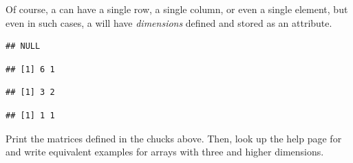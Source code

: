 \documentclass[krantz2]{krantz}\usepackage{knitr}%
\begin{document}
\begin{explainbox}
Of course, a  can have a single row, a single column, or even a single element, but even in such cases, a  will have \emph{dimensions} defined and stored as an attribute.

\begin{knitrout}\footnotesize
{}\color{fgcolor}\begin{kframe}
\begin{alltt}
 \hlkwb{<-} \hlopt{:}
\end{alltt}
\begin{verbatim}
## NULL
\end{verbatim}
\end{kframe}
\end{knitrout}

\begin{knitrout}\footnotesize
{}\color{fgcolor}\begin{kframe}
\begin{alltt}
 \hlkwb{<-} \hlstd{(}\hlopt{:}\hlstd{,}  \hlstd{=} \hlstd{)}
\end{alltt}
\begin{verbatim}
## [1] 6 1
\end{verbatim}
\begin{alltt}
 \hlkwb{<-} \hlstd{(}\hlopt{:}\hlstd{,}  \hlstd{=} \hlstd{)}
\end{alltt}
\begin{verbatim}
## [1] 3 2
\end{verbatim}
\begin{alltt}
 \hlkwb{<-} \hlstd{(}\hlstd{,}  \hlstd{=} \hlstd{)}
\end{alltt}
\begin{verbatim}
## [1] 1 1
\end{verbatim}
\end{kframe}
\end{knitrout}

\begin{playground}
Print the matrices defined in the chucks above. Then, look up the help page for  and write equivalent examples for arrays with three and higher dimensions.
\end{playground}
\end{explainbox}
\end{document}
